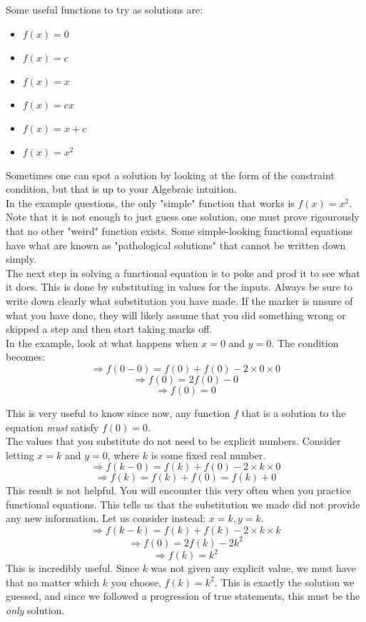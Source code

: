 \documentclass[a4paper,12pt]{article}
\begin{document}
Some useful functions to try as solutions are:
\begin{itemize}
    \item $f(x) = 0$
    \item $f(x) = c$
    \item $f(x) = x$
    \item $f(x) = cx$
    \item $f(x) = x + c$
    \item $f(x) = x^2$
\end{itemize}
Sometimes one can spot a solution by looking at the form of the constraint condition, but that is up to your Algebraic intuition. \\
In the example questions, the only "simple" function that works is $f(x) = x^2$. Note that it is not enough to just guess one solution, one must prove rigourously that no other "weird" function exists. Some simple-looking functional equations have what are known as "pathological solutions" that cannot be written down simply.\\

The next step in solving a functional equation is to poke and prod it to see what it does. This is done by substituting in values for the inputs. Always be sure to write down clearly what substitution you have made. If the marker is unsure of what you have done, they will likely assume that you did something wrong or skipped a step and then start taking marks off.\\
In the example, look at what happens when $x = 0$ and $y = 0$. The condition becomes:
$$\Rightarrow f(0 - 0) = f(0) + f(0) - 2 \times 0 \times 0$$
$$\Rightarrow f(0) = 2f(0) - 0$$
$$\Rightarrow f(0) = 0$$

This is very useful to know since now, any function $f$ that is a solution to the equation \emph{must} satisfy $f(0) = 0$. \\

The values that you substitute do not need to be explicit numbers. Consider letting $x = k$ and $y = 0$, where $k$ is some fixed real number.
$$\Rightarrow f(k - 0) = f(k) + f(0) - 2 \times k \times 0$$
$$\Rightarrow f(k) = f(k) + f(0) = f(k) + 0$$
This result is not helpful. You will encounter this very often when you practice functional equations. This tells us that the substitution we made did not provide any new information. Let us consider instead: $x = k, y = k$.
$$\Rightarrow f(k - k) = f(k) + f(k) - 2 \times k \times k$$
$$\Rightarrow f(0) = 2f(k) - 2k^2$$
$$\Rightarrow f(k) = k^2$$
This is incredibly useful. Since $k$ was not given any explicit value, we must have that no matter which $k$ you choose, $f(k) = k^2$. This is exactly the solution we guessed, and since we followed a progression of true statements, this must be the \emph{only} solution. \\
\end{document}
